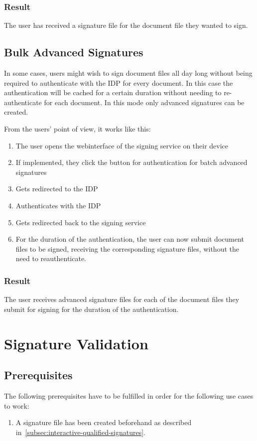 \subsubsection{Result}
The user has received a signature file for the document file they wanted to sign.

\subsection{Bulk Advanced Signatures}\label{subsec:bulk-advanced-signatures}
In some cases, users might wish to sign document files all day long without being required to authenticate with the \gls{IDP} for every document.
In this case the authentication will be cached for a certain duration without needing to re-authenticate for each document.
In this mode only advanced signatures can be created.

From the users' point of view, it works like this:
\begin{enumerate}
    \item The user opens the webinterface of the signing service on their device
    \item If implemented, they click the button for authentication for batch advanced signatures
    \item Gets redirected to the \gls{IDP}
    \item Authenticates with the \gls{IDP}
    \item Gets redirected back to the signing service
    \item For the duration of the authentication, the user can now submit document files to be signed,
        receiving the corresponding signature files, without the need to reauthenticate.
\end{enumerate}
\subsubsection{Result}
The user receives advanced signature files for each of the document files they submit for signing for the duration of the authentication.


\section{Signature Validation}\label{sec:signature-validation}

\subsection{Prerequisites}\label{subsec:prerequisites2}
The following prerequisites have to be fulfilled in order for the following use cases to work:
\begin{enumerate}
    \item A signature file has been created beforehand as described in~\ref{subsec:interactive-qualified-signatures}.
\end{enumerate}

